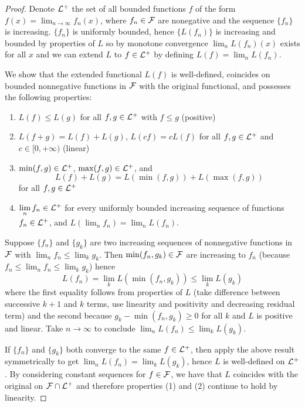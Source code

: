 \begin{proof}
  Denote $\mathcal{L}^+$ the set of all bounded functions $f$
  of the form $f(x) = \lim_{n \to \infty} f_n(x)$, where
  $f_n \in \mathcal{F}$ are nonegative and the sequence $\{f_n\}$ is increasing.
  $\{f_n\}$ is uniformly bounded, hence $\{L(f_n)\}$
  is increasing and bounded by properties of $L$ so by monotone convergence
  $\lim_n L(f_n)(x)$ exists for all $x$ and we can extend $L$
  to $f \in \mathcal{L}^+$ by defining $L(f) = \lim_n L(f_n)$.

  We show that the extended functional $L(f)$ is well-defined, coincides
  on bounded nonnegative functions in $\mathcal{F}$ with the original functional,
  and possesses the following properties:
  \begin{enumerate}
    \item $L(f) \leq L(g)$ for all $f,g \in \mathcal{L}^+$ with $f \leq g$ (positive)
    \item $L(f + g) = L(f) + L(g)$, $L(cf) = c L(f)$ for all
      $f, g \in \mathcal{L}^+$ and $c \in [0, +\infty)$ (linear)
    \item $\min(f,g) \in \mathcal{L}^+$, $\max(f,g) \in \mathcal{L}^+$, and
      \[
	L(f) + L(g) = L(\min(f,g)) + L(\max(f,g))
      \]
      for all $f, g \in \mathcal{L}^+$
    \item $\lim_n f_n \in \cL^+$ for every uniformly bounded
      increasing sequence of functions $f_n \in \mathcal{L}^+$,
      and $L(\lim_n f_n) = \lim_n L(f_n)$.
  \end{enumerate}

  Suppose $\{f_n\}$ and $\{g_k\}$ are two increasing sequences of nonnegative
  functions in $\mathcal{F}$ with $\lim_n f_n \leq \lim_k g_k$.
  Then $\min(f_n, g_k) \in \mathcal{F}$ are increasing to $f_n$
  (because $ f_n \leq \lim_n f_n \leq \lim_k g_k$) hence
  \[
    L(f_n) = \lim_k L(\min(f_n, g_k)) \leq \lim_k L(g_k)
  \]
  where the first equality follows from properties of $L$
  (take difference between successive $k+1$ and $k$ terms, use linearity
  and positivity and decreasing residual term) and the second
  because $g_k - \min(f_n, g_k) \geq 0$ for all $k$ and $L$ is positive
  and linear. Take $n \to \infty$ to conclude
  $\lim_n L(f_n) \leq \lim_k L(g_k)$.

  If $\{f_n\}$ and $\{g_k\}$ both converge to the same $f \in \mathcal{L}^+$,
  then apply the above result symmetrically to get
  $\lim_n L(f_n) = \lim_k L(g_k)$, hence $L$ is well-defined
  on $\mathcal{L}^+$. By considering constant sequences for $f \in \mathcal{F}$,
  we have that $L$ coincides with the original on $\mathcal{F} \cap \mathcal{L}^+$
  and therefore properties (1) and (2) continue to hold by linearity.


\end{proof}
